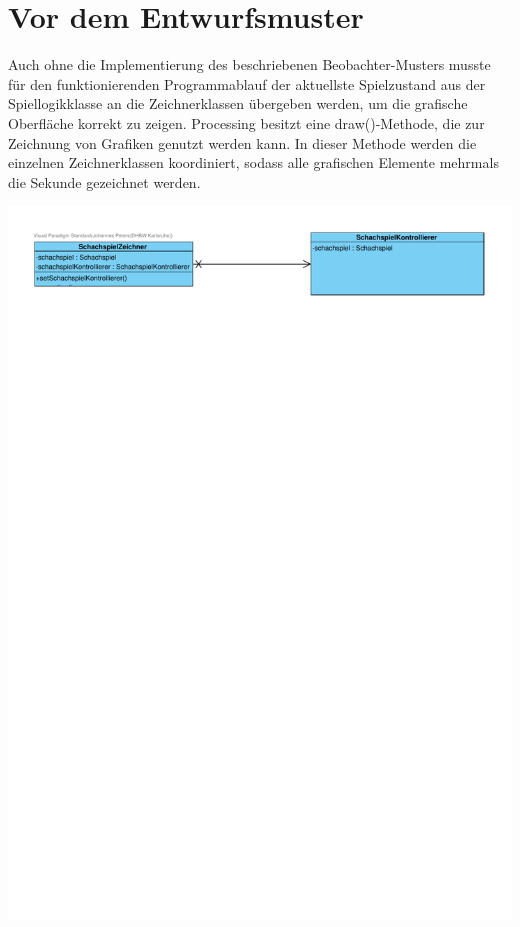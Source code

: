 \newpage

\section{Vor dem Entwurfsmuster}

Auch ohne die Implementierung des beschriebenen Beobachter-Musters musste für den funktionierenden Programmablauf der aktuellste Spielzustand aus der Spiellogikklasse an die Zeichnerklassen übergeben werden, um die grafische Oberfläche korrekt zu zeigen. 
Processing besitzt eine draw()-Methode, die zur Zeichnung von Grafiken genutzt werden kann. 
In dieser Methode werden die einzelnen Zeichnerklassen koordiniert, sodass alle grafischen Elemente mehrmals die Sekunde gezeichnet werden. 

\begin{minipage}{\linewidth}
    \centering
    \includegraphics[scale=0.75, trim={0 25cm 0 0}]{Bilder/SWE_ohne_Observer.pdf}
\end{minipage}

